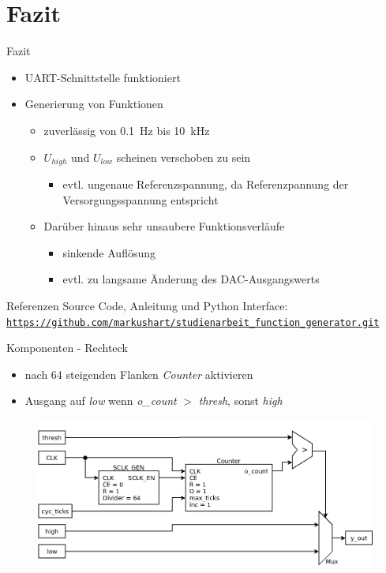 \documentclass[11pt]{beamer}
\begin{document}
\section{Fazit}
\begin{frame}{Fazit}
  \begin{itemize}
  \item UART-Schnittstelle funktioniert
  \item Generierung von Funktionen
    \begin{itemize}
      \item zuverlässig von \SI{0.1}{\hertz} bis \SI{10}{\kilo\hertz}
      \item $U_{high}$ und $U_{low}$ scheinen verschoben zu sein
      \begin{itemize}
        \item evtl. ungenaue Referenzspannung, da Referenzpannung der Versorgungsspannung entspricht
      \end{itemize}
      \item Darüber hinaus sehr unsaubere Funktionsverläufe
      \begin{itemize}
        \item sinkende Auflösung
        \item evtl. zu langsame Änderung des DAC-Ausgangswerts
      \end{itemize}
    \end{itemize}
  \end{itemize}
\end{frame}

\begin{frame}{Referenzen}
  Source Code, Anleitung und Python Interface:\\ 
  \href{https://github.com/markushart/studienarbeit_function_generator.git}{\small\texttt{https://github.com/markushart/studienarbeit\_function\_generator.git}}
\end{frame}

\begin{frame}{Komponenten - Rechteck}
  \begin{itemize}
  \item nach 64 steigenden Flanken \emph{Counter} aktivieren
  \item Ausgang auf \emph{low} wenn \emph{o\_count} $>$ \emph{thresh}, sonst \emph{high} 
  \end{itemize}
  \begin{figure}
    \includegraphics[scale=0.32]{square}
  \end{figure}
\end{frame}
\end{document}
